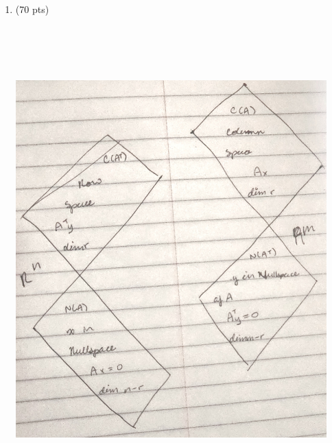 \documentclass[11pt]{article}
\begin{document}
\begin{enumerate}
\begin{enumerate}
      \end{enumerate}


    \item \label{Problem_06} (70 pts)


             
             \graphicspath{ {.} }
             \includegraphics[width=12cm, height=18cm]{hw1q6.jpg}





\end{enumerate}
\end{document}
